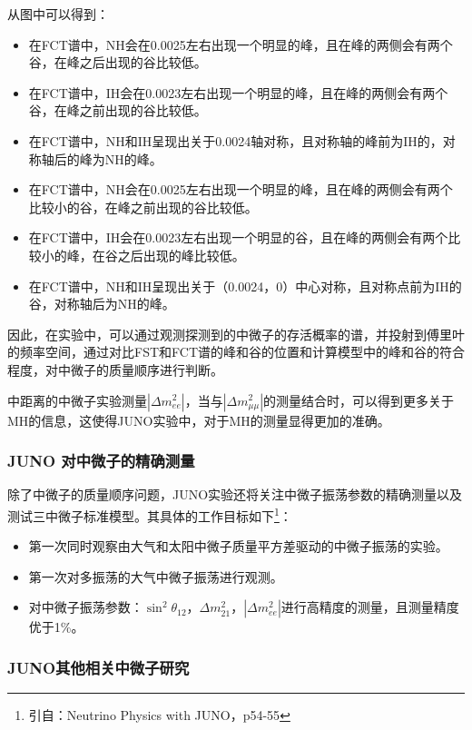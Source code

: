 \documentclass[10pt,a4paper]{article}
\begin{document}
从图中可以得到：
\begin{itemize}
	\item{在FCT谱中，NH会在0.0025左右出现一个明显的峰，且在峰的两侧会有两个谷，在峰之后出现的谷比较低。}
    \item{在FCT谱中，IH会在0.0023左右出现一个明显的峰，且在峰的两侧会有两个谷，在峰之前出现的谷比较低。}
    \item{在FCT谱中，NH和IH呈现出关于0.0024轴对称，且对称轴的峰前为IH的，对称轴后的峰为NH的峰。}
    \item{在FCT谱中，NH会在0.0025左右出现一个明显的峰，且在峰的两侧会有两个比较小的谷，在峰之前出现的谷比较低。}
    \item{在FCT谱中，IH会在0.0023左右出现一个明显的谷，且在峰的两侧会有两个比较小的峰，在谷之后出现的峰比较低。}
    \item{在FCT谱中，NH和IH呈现出关于（0.0024，0）中心对称，且对称点前为IH的谷，对称轴后为NH的峰。}
\end{itemize}

因此，在实验中，可以通过观测探测到的中微子的存活概率的谱，并投射到傅里叶的频率空间，通过对比FST和FCT谱的峰和谷的位置和计算模型中的峰和谷的符合程度，对中微子的质量顺序进行判断。


中距离的中微子实验测量$|\Delta{m_{ee}^2}|$，当与$|\Delta{m_{\mu\mu}^2}|$的测量结合时，可以得到更多关于MH的信息，这使得JUNO实验中，对于MH的测量显得更加的准确。

\subsubsection{JUNO 对中微子的精确测量}\label{sub:logicinter}

除了中微子的质量顺序问题，JUNO实验还将关注中微子振荡参数的精确测量以及测试三中微子标准模型。其具体的工作目标如下\footnote{引自：Neutrino Physics with JUNO，p54-55}：

\begin{itemize}
	\item{第一次同时观察由大气和太阳中微子质量平方差驱动的中微子振荡的实验。}
    \item{第一次对多振荡的大气中微子振荡进行观测。}
    \item{对中微子振荡参数：$\sin^2{\theta_{12}}$，$\Delta m^2_{21}$，$|\Delta m^2_{ee}|$进行高精度的测量，且测量精度优于1\%。}
\end{itemize}


\subsubsection{JUNO其他相关中微子研究}
\end{document}
